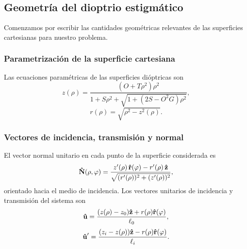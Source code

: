 \subsection{Geometría del dioptrio estigmático}

Comenzamos por escribir las cantidades geométricas relevantes de las superficies cartesianas para nuestro problema.

\subsubsection{Parametrización de la superficie cartesiana}

Las ecuaciones paramétricas de las superficies dióptricas son
\begin{equation}
  z(\rho)
  =
  \frac{(O + T\rho^2)\rho^2}
  {
  1 + S\rho^2 + \sqrt{1 + (2S - O^2G)\rho^2}
  },
  \label{eq:parametrical_ovoid_z_app}
\end{equation}
\begin{equation}
  r(\rho)
  =
  \sqrt{\rho^2 - z^2(\rho)}.
  \label{eq:parametrical_ovoid_r_app}
\end{equation}

\subsubsection{Vectores de incidencia, transmisión y normal}

El vector normal unitario en cada punto de la superficie considerada es
\begin{equation}
  \bm{\hat{\mathbf{N}}}(\rho,\varphi)
  =
  \frac{
  z'(\rho)\,\bm{\hat{\mathbf{r}}}(\varphi)
  -
  r'(\rho)\,\bm{\hat{\mathbf{z}}}
  }
  {
  \sqrt{(r'(\rho))^2+(z'(\rho))^2}
  },
  \label{eq:N_ovoid_rho_phi_app}
\end{equation}
orientado hacia el medio de incidencia.
Los vectores unitarios de incidencia y transmisión del sistema son
\begin{equation}
  \bm{\hat{\mathbf{u}}}
  =
  \frac{
  (z(\rho) - z_0)\bm{\hat{\mathbf{z}}}
  +
  r(\rho)\bm{\hat{\mathbf{r}}}(\varphi)
  }
  {
  \ell_0
  },
  \label{eq:u_for_P_in_optical_axis_app}
\end{equation}
\begin{equation}
  \bm{\hat{\mathbf{u}}}'
  =
  \frac{
  (z_i - z(\rho))\bm{\hat{\mathbf{z}}}
  -
  r(\rho)\bm{\hat{\mathbf{r}}}(\varphi)
  }
  {
  \ell_i
  }.
  \label{eq:u_prime_for_P_in_optical_axis_app}
\end{equation}

